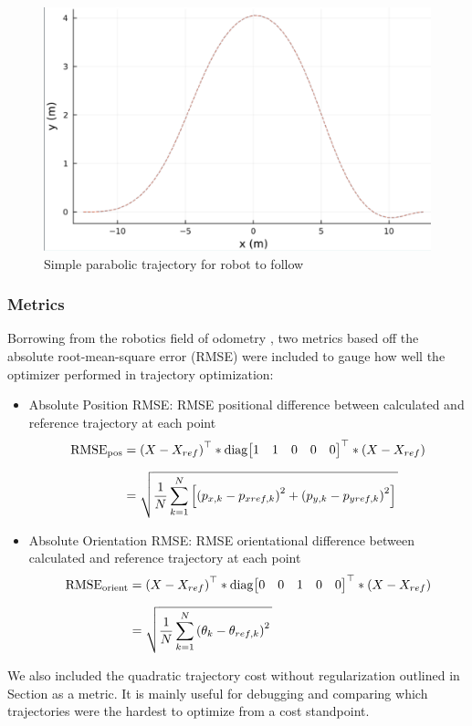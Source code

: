 \documentclass[11pt]{article}
\begin{document}
    \begin{figure}[h!]
        \centering
        \includegraphics[width=0.5\linewidth]{trajectory}
        \caption{Simple parabolic trajectory for robot to follow}
        \label{fig:trajectory}
    \end{figure}

    \subsubsection{Metrics} \label{sec:results:metrics}
    Borrowing from the robotics field of odometry \cite{metrics1}, two metrics based off the absolute root-mean-square error (RMSE) were included to gauge how well the optimizer performed in trajectory optimization:
    \begin{itemize}
        \item Absolute Position RMSE: RMSE positional difference between calculated and reference trajectory at each point \begin{align*}
            \mathrm{RMSE}_{\mathrm{pos}} &= \transp{X - X_{ref}} * \mathrm{diag}\transbmat{1 & 1 & 0 & 0 & 0} * \left(X - X_{ref}\right) \fracln
            &= \sqrt{\strut \dfrac{1}{N} \sum^N_{k=1} \left[\left(p_{x,k} - p_{xref, k}\right)^2 + \left(p_{y,k} - p_{yref, k}\right)^2\right]  \strut\strut }
        \end{align*}
        \item Absolute Orientation RMSE: RMSE orientational difference between calculated and reference trajectory at each point\begin{align*}
            \mathrm{RMSE}_{\mathrm{orient}} &= \transp{X - X_{ref}} *  \mathrm{diag}\transbmat{0 & 0 & 1 & 0 & 0} * \left(X - X_{ref}\right) \fracln
            &= \sqrt{\strut \dfrac{1}{N} \sum^N_{k=1} \left(\theta_{k} - \theta_{ref, k}\right)^2 \strut\strut }
        \end{align*}
    \end{itemize}
    
    We also included the quadratic trajectory cost without regularization outlined in Section as a metric. It is mainly useful for debugging and comparing which trajectories were the hardest to optimize from a cost standpoint.
\end{document}
